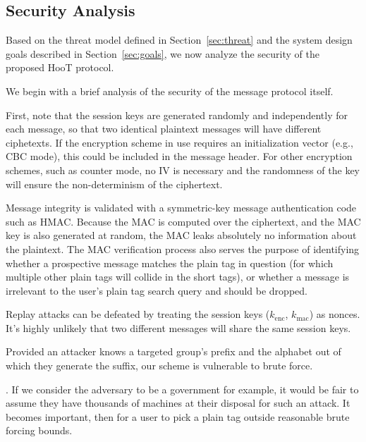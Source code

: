 \subsection{Security Analysis}
\label{sec:security}

Based on the threat model defined in Section~\ref{sec:threat} and the
system design goals described in Section~\ref{sec:goals}, we now analyze
the security of the proposed HooT protocol.

%
We begin with a brief analysis of the security of the message protocol
itself.

First, note that the session keys are generated randomly and
independently for each message, so that two identical plaintext messages
will have different ciphetexts. If the encryption scheme in use requires
an initialization vector (e.g., CBC mode), this could be included in the
message header. For other encryption schemes, such as counter mode, no
IV is necessary and the randomness of the key will ensure the
non-determinism of the ciphertext.

Message integrity is validated with a symmetric-key message
authentication code such as HMAC. Because the MAC is computed over the
ciphertext, and the MAC key is also generated at random, the MAC leaks
absolutely no information about the plaintext. The MAC verification
process also serves the purpose of identifying whether a prospective
message matches the plain tag in question (for which multiple other
plain tags will collide in the short tags), or whether a message is
irrelevant to the user's plain tag search query and should be dropped.

Replay attacks can be defeated by treating the session keys
($k_{\mathrm{enc}}$, $k_{\mathrm{mac}}$) as nonces. It's highly unlikely
that two different messages will share the same session keys.


%
Provided an attacker knows a targeted group's prefix and the alphabet
out of which they generate the suffix, our scheme is vulnerable to brute
force.

. If we consider the adversary
to be a government for example, it would be fair to assume they have
thousands of machines at their disposal for such an attack. It becomes
important, then for a user to pick a plain tag outside reasonable brute
forcing bounds.


%


